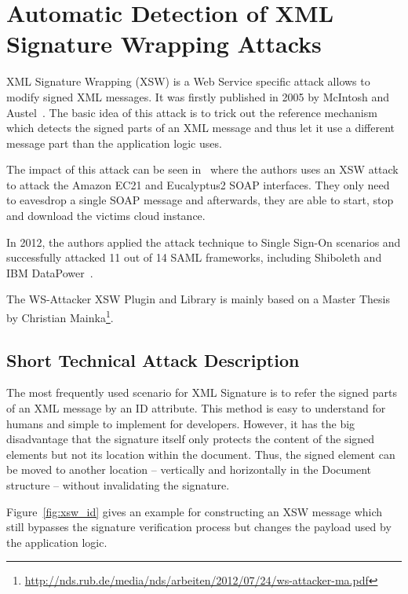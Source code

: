 \section{Automatic Detection of XML Signature Wrapping Attacks}
\label{sec:automatic_detection_of_xml_signature_wrapping_attacks}

XML Signature Wrapping (XSW) is a Web Service specific attack allows to modify signed
XML messages. 
It was firstly published in 2005 by McIntosh and Austel~\cite{xsw}. 
The basic idea of this attack is to trick out the reference mechanism which detects the signed parts
of an XML message and thus let it use a different message part than the application
logic uses.

The impact of this attack can be seen in~\cite{amazon} where the authors uses an XSW attack to
attack the Amazon EC21 and Eucalyptus2 SOAP interfaces. They only need to eavesdrop
a single SOAP message and afterwards, they are able to start, stop and download the
victims cloud instance.

In 2012, the authors applied the attack technique to Single Sign-On scenarios and successfully attacked 11 out of 14 SAML frameworks, including Shiboleth and IBM DataPower~\cite{samlattacking}.

The WS-Attacker XSW Plugin and Library is mainly based on a Master Thesis by Christian Mainka\footnote{\url{http://nds.rub.de/media/nds/arbeiten/2012/07/24/ws-attacker-ma.pdf}}.

\subsection{Short Technical Attack Description}
\label{sec:short_technical_attack_description}

The most frequently used scenario for XML Signature is to refer the signed parts of an XML message by an ID attribute. 
This method is easy to understand for humans and simple to implement for developers. 
However, it has the big disadvantage that the signature itself only protects the content of the signed elements but not its location within the document. 
Thus, the signed element can be moved to another location -- vertically and horizontally in the Document structure -- without invalidating the signature. 

Figure~\ref{fig:xsw_id} gives an example for constructing an XSW message which still bypasses the signature verification process but changes the payload used by the application logic.

